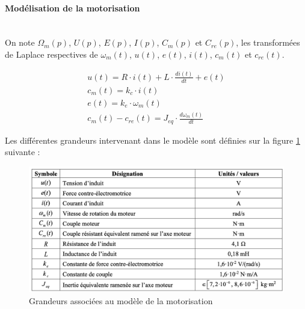 \paragraph{Modélisation de la motorisation} ~\ \\

On note $\Omega_m(p)$, $U(p)$, $E(p)$, $I(p)$, $C_m(p)$ et $C_{re}(p)$, les transformées de Laplace respectives de $\omega_m(t)$, $u(t)$, $e(t)$, $i(t)$, $c_m(t)$ et $c_{re}(t)$.

\begin{eqnarray}
u(t)=R\cdot i(t)+L\cdot\frac{di(t)}{dt}+e(t) \\
c_m(t)=k_c\cdot i(t) \\
e(t)=k_e\cdot\omega_m(t) \\
c_m(t)-c_{re}(t)=J_{eq}\cdot\frac{d\omega_m(t)}{dt}
\end{eqnarray}

Les différentes grandeurs intervenant dans le modèle sont définies sur la figure \ref{fig14} suivante :

\begin{figure}[ht!]
\begin{center}
 \includegraphics[width=0.9\linewidth]{img/fig14}
\end{center}
\caption{Grandeurs associées au modèle de la motorisation}
\label{fig14}
\end{figure}



